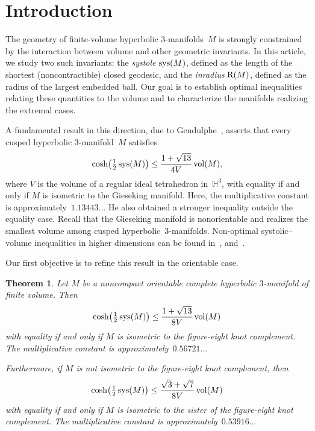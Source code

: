 \documentclass[11pt,reqno]{amsart}
\newtheorem{theorem}{Theorem}[section]
\theoremstyle{definition}
\numberwithin{equation}{section}
\newcommand{\HH}{{\mathbb H}}
\newcommand\RR{{\rm R}}
\DeclareMathOperator{\vol}{{\rm vol}}
\DeclareMathOperator{\sys}{{\rm sys}}
\numberwithin{equation}{section}
\begin{document}


\section{Introduction}

The geometry of finite-volume hyperbolic $3$-manifolds~$M$ is strongly constrained by the interaction between volume and other geometric invariants.
In this article, we study two such invariants: the \emph{systole} $\sys(M)$, defined as the length of the shortest (noncontractible) closed geodesic, and the \emph{inradius} $\RR(M)$, defined as the radius of the largest embedded ball. 
Our goal is to establish optimal inequalities relating these quantities to the volume and to characterize the manifolds realizing the extremal cases.

\medskip

A fundamental result in this direction, due to Gendulphe~\cite{gen}, asserts that every cusped hyperbolic $3$-manifold~$M$ satisfies
\begin{equation} \label{eq:gen_sys}
\cosh \!\left(\tfrac{1}{2} \sys(M) \right) \leq \frac{1+\sqrt{13}}{4 V} \vol(M),
\end{equation}
where $V$ is the volume of a regular ideal tetrahedron in~$\HH^3$, with equality if and only if $M$ is isometric to the Gieseking manifold. 
Here, the multiplicative constant is approximately~$1.13443...$
He also obtained a stronger inequality outside the equality case.
Recall that the Gieseking manifold is nonorientable and realizes the smallest volume among cusped hyperbolic~$3$-manifolds.
Non-optimal systolic--volume inequalities in higher dimensions can be found in~\cite{gen}, \cite{gro} and~\cite{gro2}.

\medskip

Our first objective is to refine this result in the orientable case.

\begin{theorem} \label{theo:sys}
Let $M$ be a noncompact orientable complete hyperbolic $3$-manifold of finite volume.
Then
\[
\cosh \!\left(\tfrac{1}{2} \sys(M) \right) \leq \frac{1+\sqrt{13}}{8 V} \vol(M)
\]
with equality if and only if $M$ is isometric to the figure-eight knot complement.
The multiplicative constant is approximately~$0.56721...$

Furthermore, if $M$ is not isometric to the figure-eight knot complement, then 
\[
\cosh \!\left(\tfrac{1}{2} \sys(M) \right) \leq \frac{\sqrt{3}+\sqrt{7}}{8 V} \vol(M)
\]
with equality if and only if $M$ is isometric to the sister of the figure-eight knot complement.
The multiplicative constant is approximately~$0.53916...$
%
\end{theorem}
\end{document}
